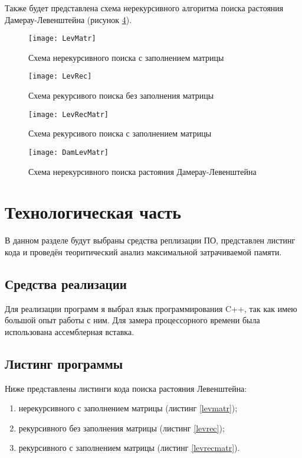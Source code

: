 \documentclass[utf8x, 12pt]{G7-32}
\begin{document}
        Также будет представлена схема нерекурсивного алгоритма поиска растояния Дамерау-Левенштейна (рисунок \ref{schema:matr:Dameray-Levenstein}).

    \begin{figure}[h!]
        \centering
        \texttt{[image: LevMatr]}
        \caption{Схема нерекурсивного поиска с заполнением матрицы}
        \label{schema:matr:Levenstein}
    \end{figure}

    \begin{figure}[h!]
        \centering
        \texttt{[image: LevRec]}
        \caption{Схема рекурсивого поиска без заполнения матрицы}
        \label{schema:rec:Levenstein}
    \end{figure}

    \begin{figure}[h!]
        \centering
        \texttt{[image: LevRecMatr]}
        \caption{Схема рекурсивого поиска с заполнением матрицы}
        \label{schema:rec-matr:Levenstein}
    \end{figure}

    \begin{figure}[h!]
        \centering
        \texttt{[image: DamLevMatr]}
        \caption{Схема нерекурсивного поиска растояния Дамерау-Левенштейна}
        \label{schema:matr:Dameray-Levenstein}
    \end{figure}

\chapter{Технологическая часть}
В данном разделе будут выбраны средства реплизации ПО, представлен листинг кода
и проведён теоритический анализ максимальной затрачиваемой памяти.
\section{Средства реализации}
Для реализации программ я выбрал язык программирования C++, так как имею большой опыт работы с ним.
Для замера процессорного времени была использована ассемблерная вставка\cite{link_time}.

    \section{Листинг программы}
        Ниже представлены листинги кода поиска растояния Левенштейна: \begin{enumerate}
            \item нерекурсивного с заполнением матрицы (листинг \ref{levmatr});
            \item рекурсивного без заполнения матрицы (листинг \ref{levrec});
            \item рекурсивного с заполнением матрицы (листинг \ref{levrecmatr}).
        \end{enumerate}
        
\end{document}
